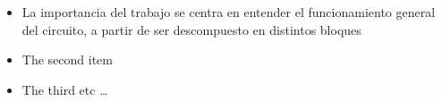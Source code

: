 \begin{itemize}  
\item La importancia del trabajo se centra en entender el funcionamiento general del circuito, a partir de ser descompuesto en distintos bloques	



\item The second item 



\item The third etc \ldots 



\end{itemize}
